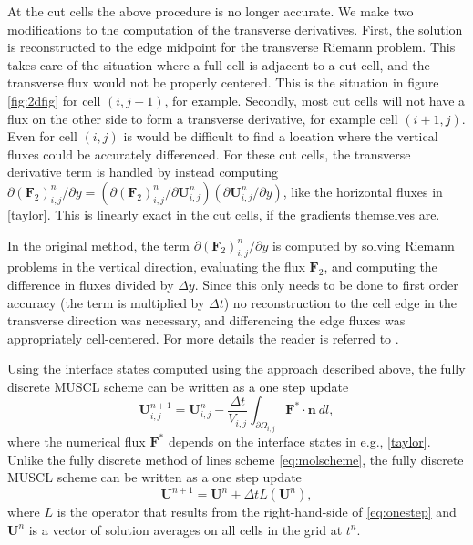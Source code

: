 At the cut cells the above procedure is no longer accurate.   We make two modifications to the
computation of the transverse derivatives. First,
the solution is reconstructed to the edge midpoint  for the transverse Riemann problem.
This takes care of the situation where a full cell is adjacent to a cut cell, and
the transverse flux would not be properly centered. This is the situation
in figure \ref{fig:2dfig} for cell $(i,j+1)$, for example.
Secondly, most cut cells will not have a flux on the other side to form a
transverse derivative, for example cell $(i+1,j)$. Even for cell $(i,j)$ is would
be difficult to find a location where the vertical fluxes could be accurately differenced.
For these cut cells, the transverse derivative term is handled by instead computing
$ \partial (\mathbf{F}_2)_{i,j}^n / \partial y = ( \partial (\mathbf{F}_2)_{i,j}^n / \partial \mathbf{U}_{i,j}^n)( \partial \mathbf{U}_{i,j}^n / \partial y)$,
like the horizontal fluxes in \eqref{taylor}. This is linearly exact in the cut cells, 
if the gradients themselves are.


In the original method, the term $\partial (\mathbf{F}_2)_{i,j}^n / \partial y$ is computed by solving Riemann
problems in the vertical direction,  evaluating the flux $\mathbf{F}_2 $, and computing the
difference in fluxes divided by $\Delta y$.
Since this only needs to be done to first order accuracy (the term is multiplied
by $\Delta t$)  no reconstruction to the cell edge  in the transverse 
direction was necessary,
and differencing the edge fluxes was appropriately cell-centered.
For more details the reader is referred to \cite{Colella:Unsplit}.

Using the interface states computed using the approach described above, the fully discrete MUSCL scheme can be written as a one step update
\begin{equation}\label{eq:onestep}
\mathbf{U}_{i,j}^{n+1} = \mathbf{U}^n_{i,j} - \frac{\Delta t}{V_{i,j}} \int_{\partial \Omega_{i,j}} \mathbf{F}^* \cdot \mathbf{n}~dl,
\end{equation}
where 
the numerical flux $\mathbf{F}^*$ depends on the interface states in e.g., \eqref{taylor}.
Unlike the fully discrete method of lines scheme \eqref{eq:molscheme}, the fully discrete MUSCL scheme can be written as a one step update
\begin{equation}\label{eq:musclscheme}
\mathbf{U}^{n+1} = \mathbf{U}^{n} + \Delta t L(\mathbf{U}^{n}),
\end{equation}
where $L$ is the operator that results from the right-hand-side of \eqref{eq:onestep} and $\mathbf{U}^{n}$ is a vector of solution averages on all cells in the grid at $t^n$.


